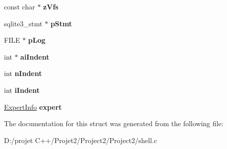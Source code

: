 \begin{DoxyCompactItemize}
const char $\ast$ {\bfseries z\+Vfs}
\item 
\mbox{\label{struct_shell_state_a443b930c7001c9b669728b917c2f5587}} 
sqlite3\+\_\+stmt $\ast$ {\bfseries p\+Stmt}
\item 
\mbox{\label{struct_shell_state_a9ca42a0d7bf19e576de8ea13ba40b61c}} 
F\+I\+LE $\ast$ {\bfseries p\+Log}
\item 
\mbox{\label{struct_shell_state_a0481fdd4a0c88fb17f1a66ba87939ce9}} 
int $\ast$ {\bfseries ai\+Indent}
\item 
\mbox{\label{struct_shell_state_a73e3fe627474f4de6c0e04837ee0b0bd}} 
int {\bfseries n\+Indent}
\item 
\mbox{\label{struct_shell_state_a08d5d59ae0d44497aca79e89a5b8f0fe}} 
int {\bfseries i\+Indent}
\item 
\mbox{\label{struct_shell_state_a784694d7631a3e51d76dc7b284149b16}} 
\mbox{\hyperlink{struct_expert_info}{Expert\+Info}} {\bfseries expert}
\end{DoxyCompactItemize}


The documentation for this struct was generated from the following file\+:\begin{DoxyCompactItemize}
\item 
D\+:/projet C++/\+Projet2/\+Project2/\+Project2/shell.\+c\end{DoxyCompactItemize}
